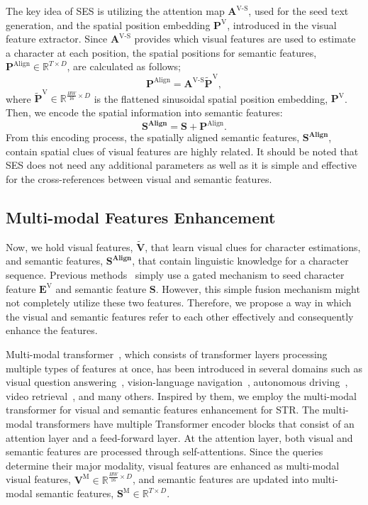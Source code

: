 \documentclass[runningheads]{llncs}
\begin{document}
The key idea of SES is utilizing the attention map $\mathbf{A}^{\text{V-S}}$, used for the seed text generation, and the spatial position embedding $\mathbf{P}^\text{V}$, introduced in the visual feature extractor. Since $\mathbf{A}^{\text{V-S}}$ provides which visual features are used to estimate a character at each position, the spatial positions for semantic features, $\mathbf{P}^\text{Align} \in \mathbb{R}^{T \times D}$, are calculated as follows;
\begin{equation}
   \mathbf{P}^\text{Align} =  \mathbf{A}^{\text{V-S}}  \widetilde{\mathbf{P}}^{\text{V}},
\end{equation}
where $\widetilde{\mathbf{P}}^{\text{V}} \in \mathbb{R}^{\frac{HW}{16} \times D}$ is the flattened sinusoidal spatial position embedding, $\mathbf{P}^{\text{V}}$. Then, we encode the spatial information into semantic features:
\begin{equation}
   \mathbf{S^\text{Align}} = \mathbf{S} + \mathbf{P}^\text{Align}.
\end{equation}
From this encoding process, the spatially aligned semantic features, $\mathbf{S^\text{Align}}$, contain spatial clues of visual features are highly related. 
It should be noted that SES does not need any additional parameters as well as it is simple and effective for the cross-references between visual and semantic features. 


\subsection{Multi-modal Features Enhancement}

Now, we hold visual features, $\tilde{\mathbf{V}}$, that learn visual clues for character estimations, and semantic features, $\mathbf{S^\text{Align}}$, that contain linguistic knowledge for a character sequence. Previous methods~\cite{Yu_2020_CVPR_SRN,ABINet} simply use a gated mechanism to seed character feature $\mathbf{E}^{\text{V}}$ and semantic feature $\mathbf{S}$. However, this simple fusion mechanism might not completely utilize these two features. Therefore, we propose a way in which the visual and semantic features refer to each other effectively and consequently enhance the features.

Multi-modal transformer~\cite{tsai2019MULT_MT}, which consists of transformer layers processing multiple types of features at once, has been introduced in several domains such as visual question answering~\cite{hu2020iterative_M4C}, vision-language navigation~\cite{chen2021hamt_VLN}, autonomous driving~\cite{prakash2021multi}, video retrieval~\cite{gabeur2020multi_VR}, and many others. Inspired by them, we employ the multi-modal transformer for visual and semantic features enhancement for STR. The multi-modal transformers have multiple Transformer encoder blocks that consist of an attention layer and a feed-forward layer. At the attention layer, both visual and semantic features are processed through self-attentions. Since the queries determine their major modality, visual features are enhanced as multi-modal visual features, $\mathbf{V}^\text{M} \in \mathbb{R}^{\frac{HW}{16} \times D}$, and semantic features are updated into multi-modal semantic features, $\mathbf{S}^\text{M} \in \mathbb{R}^{T \times D}$. 
\end{document}
